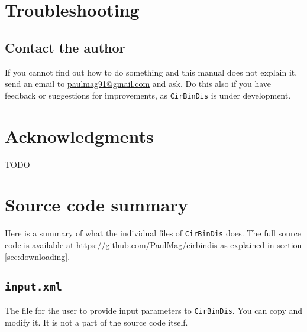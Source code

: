 \documentclass[a4paper, 12pt, english, titlepage]{article}
\newcommand{\sname}{\texttt{CirBinDis}\xspace}
\begin{document}
\section{Troubleshooting}

\subsection{Contact the author}
    If you cannot find out how to do something and this manual does not explain it,
    send an email to \href{mailto:paulmag91@gmail.com}{paulmag91@gmail.com} and ask.
    Do this also if you have feedback or suggestions for improvements, as \sname is under development.




\section{Acknowledgments}
TODO


\section{Source code summary}

Here is a summary of what the individual files of \sname does.
The full source code is available at \url{https://github.com/PaulMag/cirbindis} as explained in section \vref{sec:downloading}.

\subsection{\texttt{input.xml}}
    The file for the user to provide input parameters to \sname. You can copy and modify it. It is not a part of the source code itself.
\end{document}

